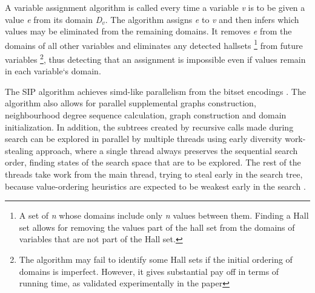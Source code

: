 \documentclass{l4proj}
\begin{document}
A variable assignment algorithm is called every time a variable \emph{v} is to be given a value \emph{e} from its domain \emph{D$_{v}$}. The algorithm assigns \emph{e} to \emph{v} and then infers which values may be eliminated from the remaining domains. It removes \emph{e} from the domains of all other variables and eliminates any detected \glspl{hallset} \footnote{A set of \emph{n} whose domains include only \emph{n} values between them. Finding a Hall set allows for removing the values part of the hall set from the domains of variables that are not part of the Hall set.} from future variables \footnote{The algorithm may fail to identify some Hall sets if the initial ordering of domains is imperfect. However, it gives substantial pay off in terms of running time, as validated experimentally in the paper}, thus detecting that an assignment is impossible even if values remain in each variable`s domain.

The SIP algorithm achieves \gls{simd}-like parallelism from the bitset encodings \cite{CP2015}. The algorithm also allows for parallel supplemental graphs construction, neighbourhood degree sequence calculation, graph construction and domain initialization. In addition, the subtrees created by recursive calls made during search can be explored in parallel by multiple threads using early diversity work-stealing approach, where a single thread always preserves the sequential search order, finding states of the search space that are to be explored. The rest of the threads take work from the main thread, trying to steal early in the search tree, because value-ordering heuristics are expected to be weakest early in the search \cite{Harvey:1995}.
\end{document}
